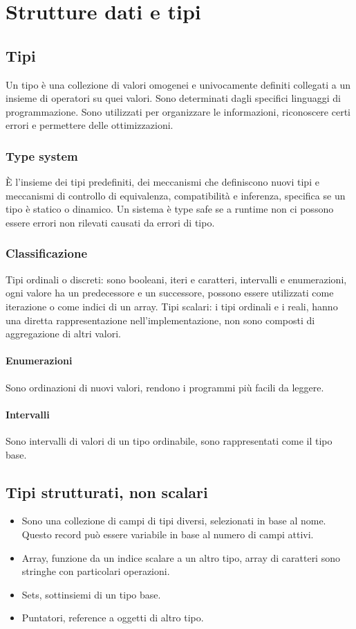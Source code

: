 \chapter{Strutture dati e tipi}
\section{Tipi}
Un tipo \`e una collezione di valori omogenei e univocamente definiti collegati a un insieme di operatori su quei valori. Sono determinati dagli specifici linguaggi di 
programmazione. Sono utilizzati per organizzare le informazioni, riconoscere certi errori e permettere delle ottimizzazioni.
\subsection{Type system}
\`E l'insieme dei tipi predefiniti, dei meccanismi che definiscono nuovi tipi e meccanismi di controllo di equivalenza, compatibilit\`a e inferenza, specifica se un tipo \`e
statico o dinamico. Un sistema \`e type safe se a runtime non ci possono essere errori non rilevati causati da errori di tipo. 
\subsection{Classificazione}
Tipi ordinali o discreti: sono booleani, iteri e caratteri, intervalli e enumerazioni, ogni valore ha un predecessore e un successore, possono essere utilizzati come iterazione
o come indici di un array. Tipi scalari: i tipi ordinali e i reali, hanno una diretta rappresentazione nell'implementazione, non sono composti di aggregazione di altri valori. 
\subsubsection{Enumerazioni}
Sono ordinazioni di nuovi valori, rendono i programmi pi\`u facili da leggere. 
\subsubsection{Intervalli}
Sono intervalli di valori di un tipo ordinabile, sono rappresentati come il tipo base.
\section{Tipi strutturati, non scalari}
\begin{itemize}
\item Sono una collezione di campi di tipi diversi, selezionati in base al nome. Questo record pu\`o essere variabile in base al numero di campi attivi. 
\item Array, funzione da un indice scalare a un altro tipo, array di caratteri sono stringhe con particolari operazioni.
\item Sets, sottinsiemi di un tipo base.
\item Puntatori, reference a oggetti di altro tipo.
\end{itemize}
